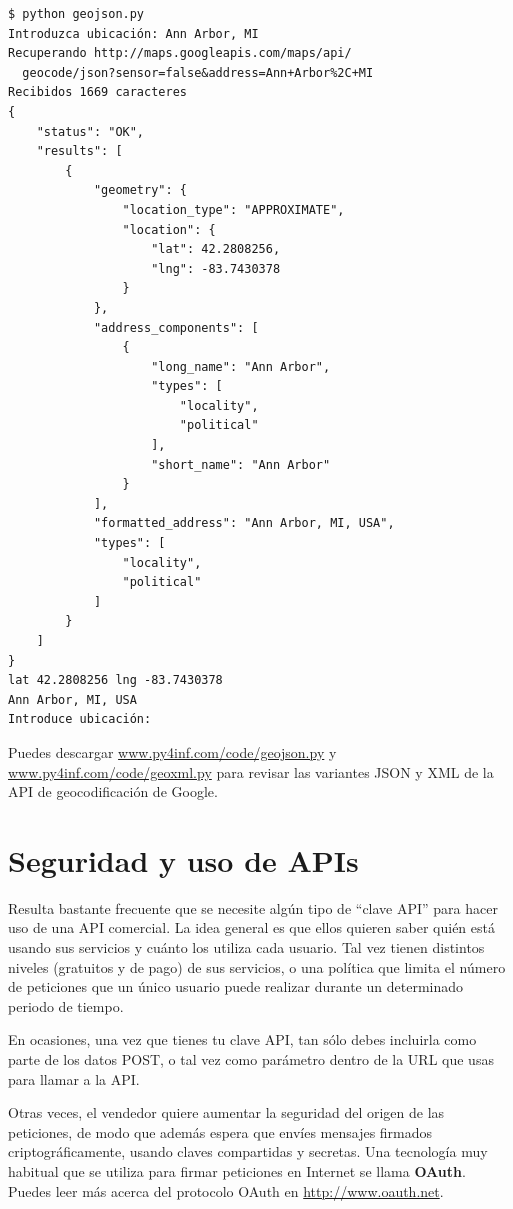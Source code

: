 \beforeverb
\begin{verbatim}
$ python geojson.py
Introduzca ubicación: Ann Arbor, MI
Recuperando http://maps.googleapis.com/maps/api/
  geocode/json?sensor=false&address=Ann+Arbor%2C+MI
Recibidos 1669 caracteres
{
    "status": "OK", 
    "results": [
        {
            "geometry": {
                "location_type": "APPROXIMATE", 
                "location": {
                    "lat": 42.2808256, 
                    "lng": -83.7430378
                }
            }, 
            "address_components": [
                {
                    "long_name": "Ann Arbor", 
                    "types": [
                        "locality", 
                        "political"
                    ], 
                    "short_name": "Ann Arbor"
                } 
            ], 
            "formatted_address": "Ann Arbor, MI, USA", 
            "types": [
                "locality", 
                "political"
            ]
        }
    ]
}
lat 42.2808256 lng -83.7430378
Ann Arbor, MI, USA
Introduce ubicación:
\end{verbatim}
\afterverb
%
Puedes descargar
\url{www.py4inf.com/code/geojson.py} y
\url{www.py4inf.com/code/geoxml.py} para revisar
las variantes JSON y XML de la API de geocodificación de Google.

\section{Seguridad y uso de APIs}

Resulta bastante frecuente que se necesite algún tipo de
``clave API'' para hacer uso de una API comercial. La
idea general es que ellos quieren saber quién está usando
sus servicios y cuánto los utiliza cada usuario.
Tal vez tienen distintos niveles (gratuitos y de pago) de sus servicios,
o una política que limita el número de peticiones
que un único usuario puede realizar durante un determinado
periodo de tiempo.

En ocasiones, una vez que tienes tu clave API, tan sólo debes incluirla
como parte de los datos POST, o tal vez como parámetro
dentro de la URL que usas para llamar a la API.

Otras veces, el vendedor quiere aumentar la seguridad del
origen de las peticiones, de modo que además espera que
envíes mensajes firmados criptográficamente, usando claves
compartidas y secretas. Una tecnología muy habitual que se utiliza
para firmar peticiones en Internet se llama {\bf OAuth}.
Puedes leer más acerca del protocolo OAuth en 
\url{http://www.oauth.net}.


